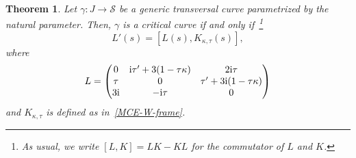 \documentclass[pdftex]{sigma}
\numberwithin{equation}{section}
\newtheorem{thmx}{Theorem} %
\def\S{\mathcal{S}}
\def\S{\mathcal{S}}
\begin{document}
\begin{thmx}\label{thmA}
Let $\gamma\colon J \to \S$ be a generic transversal curve parametrized by the natural parameter.
Then, $\gamma$
is a critical curve
if and only if~\footnote{As usual, we write $[L, K] = LK - KL$ for the commutator of $L$ and $K$.}
\begin{equation}\label{Lax-eqn}
L' (s)=
[L (s), K_{\kappa,\tau}(s)] ,
 \end{equation}
where
\begin{equation}\label{obser-L}
 L = \begin{pmatrix}
 0 & {\rm i} \tau'+ 3(1 - \tau\kappa) & 2 {\rm i} \tau\\
 \tau & 0 & \tau'+ 3{\rm i}(1 - \tau\kappa)\\
 3{\rm i} & -{\rm i} \tau& 0\\
 \end{pmatrix}
 \end{equation}
%
and $K_{\kappa,\tau}$ is defined as in~\eqref{MCE-W-frame}.
\end{thmx}
\end{document}

